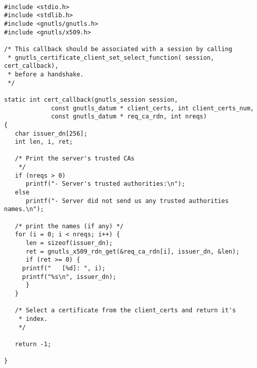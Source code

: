 \begin{verbatim}

#include <stdio.h>
#include <stdlib.h>
#include <gnutls/gnutls.h>
#include <gnutls/x509.h>

/* This callback should be associated with a session by calling
 * gnutls_certificate_client_set_select_function( session, cert_callback),
 * before a handshake.
 */

static int cert_callback(gnutls_session session,
			 const gnutls_datum * client_certs, int client_certs_num,
			 const gnutls_datum * req_ca_rdn, int nreqs)
{
   char issuer_dn[256];
   int len, i, ret;

   /* Print the server's trusted CAs
    */
   if (nreqs > 0)
      printf("- Server's trusted authorities:\n");
   else
      printf("- Server did not send us any trusted authorities names.\n");

   /* print the names (if any) */
   for (i = 0; i < nreqs; i++) {
      len = sizeof(issuer_dn);
      ret = gnutls_x509_rdn_get(&req_ca_rdn[i], issuer_dn, &len);
      if (ret >= 0) {
	 printf("   [%d]: ", i);
	 printf("%s\n", issuer_dn);
      }
   }

   /* Select a certificate from the client_certs and return it's
    * index.
    */

   return -1;

}

\end{verbatim}
